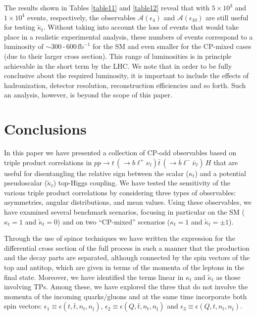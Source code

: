 \documentclass[aps,preprint,tightenlines,floatfix,superscriptaddress,nofootinbib,showpacs]{revtex4-1}
\def\tbar{\bar{t}}
\def\bbar{\bar{b}}
\def\nubar{{\bar{\nu}}_{\ell}}
\def\ppprocess{pp\to t\,\left(\rightarrow b {\ell}^+ \nu_{\ell}\right) \tbar\,\left(\rightarrow\bbar {\ell}^-\nubar\right)\,H}
\def\kp{\kappa_t}
\def\kpt{\tilde{\kappa}_t}
\def\TPa{\epsilon(t,\tbar,n_t,n_{\tbar})}
\def\TPb{\epsilon(Q,\tbar,n_t,n_{\tbar})}
\def\TPc{\epsilon(Q,t,n_t,n_{\tbar})}
\begin{document}
The
results shown in Tables \ref{table11} and \ref{table12} reveal that
with $5\times 10^3$ and $1\times 10^4$ events, respectively, the
observables $\mathcal{A}(\epsilon_4)$ and $\mathcal{A}(\epsilon_{10})$
are still useful for testing $\kpt$. Without taking into account
the loss of events that would take place in a realistic 
experimental analysis, these numbers of events
correspond to a luminosity of $\sim
300\,$-$\,600\,\mathrm{fb}^{-1}$ for the SM and even smaller for the
$\mathrm{CP}$-mixed cases (due to their larger cross section). This range
of luminosities is in principle achievable in the short term by the
LHC. We note that in order to be fully conclusive about the required
luminosity, it is important to include the effects of hadronization,
detector resolution, reconstruction efficiencies and so
forth. Such an analysis, however, is beyond the scope of this
paper.
%
\section{Conclusions}
\label{sec7}
%
In this paper we have presented a collection of $\mathrm{CP}$-odd
observables based on triple product correlations
in $\ppprocess$ that are useful for
disentangling the relative sign between the scalar ($\kp$) and a
potential pseudoscalar ($\kpt$) top-Higgs coupling.
We have tested the
sensitivity of the various triple product correlations
by considering three types of
observables: asymmetries, angular distributions, and mean values.
Using these observables, we have examined several benchmark
scenarios, focusing in particular on the SM ($\kp=1$ and $\kpt=0$)
and on two ``$\mathrm{CP}$-mixed'' scenarios ($\kp=1$ and $\kpt=\pm1$).
\par

Through the use of spinor techniques we have written the expression
for the differential cross section of the full process in such a
manner that the production and the decay parts are separated, although
connected by the spin vectors of the top and antitop, which are given
in terms of the momenta of the leptons in the final state. Moreover,
we have identified the terms linear in $\kp$ and $\kpt$ as those
involving TPs. Among these, we have explored the three that do not
involve the momenta of the incoming quarks/gluons and at the same time
incorporate both spin vectors: $\epsilon_1\equiv \TPa$,
$\epsilon_2\equiv \TPb$ and $\epsilon_3\equiv \TPc$.\par
\end{document}
